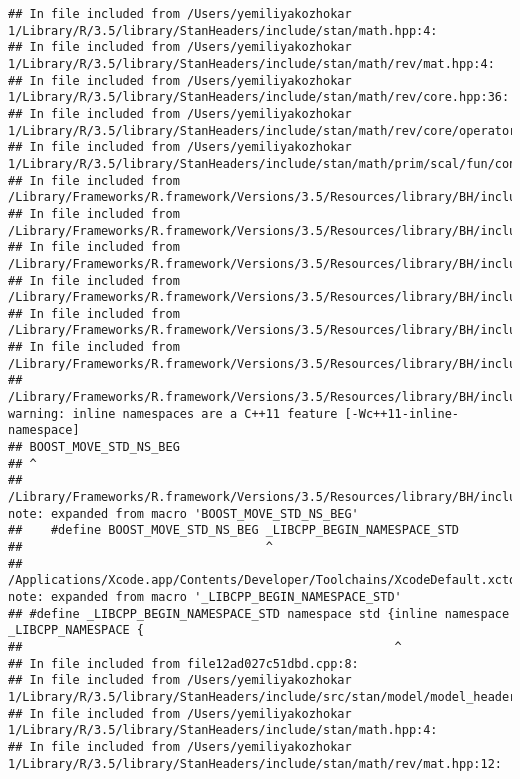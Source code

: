 \documentclass[]{article}
\begin{document}
\begin{verbatim}
## In file included from /Users/yemiliyakozhokar 1/Library/R/3.5/library/StanHeaders/include/stan/math.hpp:4:
## In file included from /Users/yemiliyakozhokar 1/Library/R/3.5/library/StanHeaders/include/stan/math/rev/mat.hpp:4:
## In file included from /Users/yemiliyakozhokar 1/Library/R/3.5/library/StanHeaders/include/stan/math/rev/core.hpp:36:
## In file included from /Users/yemiliyakozhokar 1/Library/R/3.5/library/StanHeaders/include/stan/math/rev/core/operator_unary_plus.hpp:7:
## In file included from /Users/yemiliyakozhokar 1/Library/R/3.5/library/StanHeaders/include/stan/math/prim/scal/fun/constants.hpp:4:
## In file included from /Library/Frameworks/R.framework/Versions/3.5/Resources/library/BH/include/boost/math/constants/constants.hpp:13:
## In file included from /Library/Frameworks/R.framework/Versions/3.5/Resources/library/BH/include/boost/math/tools/convert_from_string.hpp:15:
## In file included from /Library/Frameworks/R.framework/Versions/3.5/Resources/library/BH/include/boost/lexical_cast.hpp:32:
## In file included from /Library/Frameworks/R.framework/Versions/3.5/Resources/library/BH/include/boost/lexical_cast/try_lexical_convert.hpp:42:
## In file included from /Library/Frameworks/R.framework/Versions/3.5/Resources/library/BH/include/boost/lexical_cast/detail/converter_lexical.hpp:52:
## In file included from /Library/Frameworks/R.framework/Versions/3.5/Resources/library/BH/include/boost/container/container_fwd.hpp:61:
## /Library/Frameworks/R.framework/Versions/3.5/Resources/library/BH/include/boost/container/detail/std_fwd.hpp:27:1: warning: inline namespaces are a C++11 feature [-Wc++11-inline-namespace]
## BOOST_MOVE_STD_NS_BEG
## ^
## /Library/Frameworks/R.framework/Versions/3.5/Resources/library/BH/include/boost/move/detail/std_ns_begin.hpp:18:34: note: expanded from macro 'BOOST_MOVE_STD_NS_BEG'
##    #define BOOST_MOVE_STD_NS_BEG _LIBCPP_BEGIN_NAMESPACE_STD
##                                  ^
## /Applications/Xcode.app/Contents/Developer/Toolchains/XcodeDefault.xctoolchain/usr/include/c++/v1/__config:390:52: note: expanded from macro '_LIBCPP_BEGIN_NAMESPACE_STD'
## #define _LIBCPP_BEGIN_NAMESPACE_STD namespace std {inline namespace _LIBCPP_NAMESPACE {
##                                                    ^
## In file included from file12ad027c51dbd.cpp:8:
## In file included from /Users/yemiliyakozhokar 1/Library/R/3.5/library/StanHeaders/include/src/stan/model/model_header.hpp:4:
## In file included from /Users/yemiliyakozhokar 1/Library/R/3.5/library/StanHeaders/include/stan/math.hpp:4:
## In file included from /Users/yemiliyakozhokar 1/Library/R/3.5/library/StanHeaders/include/stan/math/rev/mat.hpp:12:

\end{verbatim}
\end{document}
